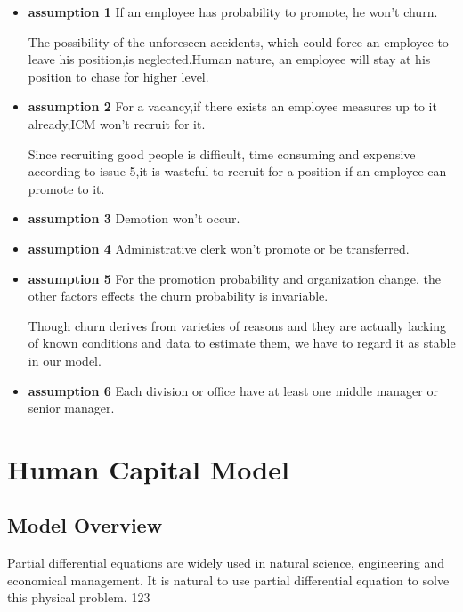 \documentclass[12pt,a4paper,titlepage]{article}
\begin{document}
\begin{itemize}
\item \textbf{assumption 1} If an employee has probability to
  promote, he won't churn.

The possibility of the unforeseen accidents, which could force an
employee to leave his position,is neglected.Human nature, an employee
will stay at his position to chase for higher level.

\item \textbf{assumption 2} For a vacancy,if there exists an
  employee measures up to it already,ICM won't recruit for it.

Since recruiting good people is difficult, time consuming and
expensive according to issue 5,it is wasteful to recruit for a
position if an employee can promote to it.

\item \textbf{assumption 3} Demotion won't occur.

\item \textbf{assumption 4} Administrative clerk won't promote or be
  transferred.

\item \textbf{assumption 5} For the promotion probability and
  organization change, the other factors effects the churn probability
  is invariable.

Though churn derives from varieties of reasons and they are actually
lacking of known conditions and data to estimate them, we have to
regard it as stable in our model.

\item \textbf{assumption 6} Each division or office have at least one
  middle manager or senior manager.

\end{itemize}

\section{Human Capital Model}
\label{sec:human-capital-model}

\subsection{Model Overview}
\label{sec:model-overview}

Partial differential equations are widely used in natural science, engineering and economical management.
It is natural to use partial differential equation to solve this physical problem. 123
\end{document}
